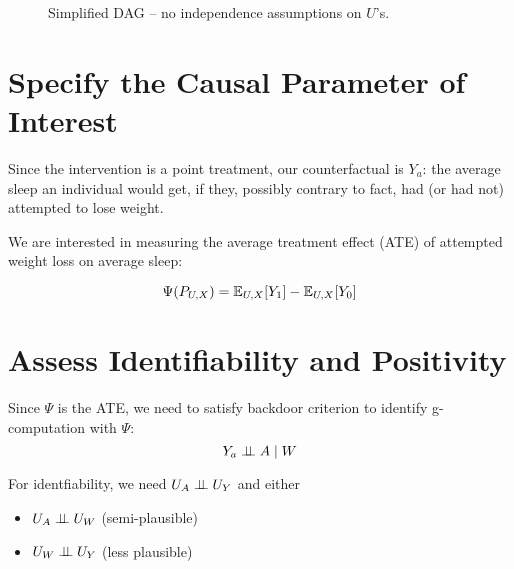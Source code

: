\documentclass{article}
\begin{document}
\begin{figure}[h]
    \centering
  \caption{Simplified DAG -- no independence assumptions on $U$'s.}
  \label{fig:DAG}
\end{figure}


\section{Specify the Causal Parameter of Interest}

Since the intervention is a point treatment, our counterfactual is $Y_{a}$: the average sleep an individual would get, if they, possibly contrary to fact, had (or had not) attempted to lose weight.

We are interested in measuring the average treatment effect (ATE) of attempted weight loss on average sleep:

$$\Psi(P_{U,X}) = \mathbb{E}_{U,X}[Y_1] - \mathbb{E}_{U,X}[Y_0]$$

\section{Assess Identifiability and Positivity}

Since $\Psi$ is the ATE, we need to satisfy backdoor criterion to identify g-computation with $\Psi$:
   $$Y_{a} \perp\hspace{-5pt}\perp A \mid W$$

For identfiability, we need $U_{A} \perp\hspace{-5pt}\perp U_{Y}$ and either
    \begin{itemize}
      \item $U_{A} \perp\hspace{-5pt}\perp U_{W}$  (semi-plausible)
      \item $U_{W} \perp\hspace{-5pt}\perp U_{Y}$  (less plausible)
    \end{itemize}
\end{document}

